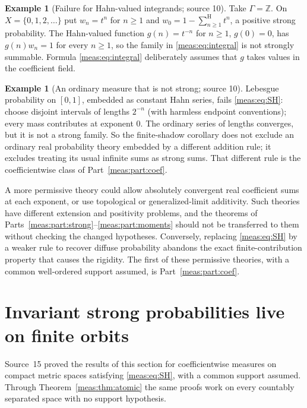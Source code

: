 \documentclass[11pt]{article}
\numberwithin{equation}{section}
\theoremstyle{definition}
\newtheorem{example}[theorem]{Example}
\theoremstyle{remark}
\newcommand{\Z}{\mathbb Z}
\newcommand{\hsum}{\mathop{\sum}\nolimits^{\mathrm H}}
\begin{document}
\begin{example}[Failure for Hahn-valued integrands; source 10]
\label{meas:ex:hahn-integrand}
Take $\Gamma=\Z$. On $X=\{0,1,2,\ldots\}$ put $w_n=t^n$ for $n\ge1$ and
$w_0=1-\hsum_{n\ge1}t^n$, a positive strong probability. The Hahn-valued
function $g(n)=t^{-n}$ for $n\ge1$, $g(0)=0$, has $g(n)w_n=1$ for every $n\ge1$,
so the family in \eqref{meas:eq:integral} is not strongly summable. Formula
\eqref{meas:eq:integral} deliberately assumes that $g$ takes values in the
coefficient field.
\end{example}

\begin{example}[An ordinary measure that is not strong; source 10]
\label{meas:ex:lebesgue}
Lebesgue probability on $[0,1]$, embedded as constant Hahn series, fails
\eqref{meas:eq:SH}: choose disjoint intervals of lengths $2^{-n}$ (with harmless
endpoint conventions); every mass contributes at exponent $0$. The ordinary
series of lengths converges, but it is not a strong family. So the
finite-shadow corollary does not exclude an ordinary real probability theory
embedded by a different addition rule; it excludes treating its usual infinite
sums as strong sums. That different rule is the coefficientwise class of
Part~\ref{meas:part:coef}.
\end{example}

A more permissive theory could allow absolutely convergent real coefficient
sums at each exponent, or use topological or generalized-limit additivity.
Such theories have different extension and positivity problems, and the
theorems of Parts~\ref{meas:part:strong}--\ref{meas:part:moments} should not
be transferred to them without checking the changed hypotheses. Conversely,
replacing \eqref{meas:eq:SH} by a weaker rule to recover diffuse probability
abandons the exact finite-contribution property that causes the rigidity. The
first of these permissive theories, with a common well-ordered support
assumed, is Part~\ref{meas:part:coef}.

\section{Invariant strong probabilities live on finite orbits}
\label{meas:sec:orbits}

Source~15 proved the results of this section for coefficientwise measures on
compact metric spaces satisfying \eqref{meas:eq:SH}, with a common support
assumed. Through Theorem~\ref{meas:thm:atomic} the same proofs work on every
countably separated space with no support hypothesis.
\end{document}
